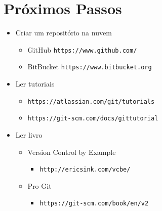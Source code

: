 \documentclass{beamer}
\newenvironment{slide}{\begin{frame}{\insertsection}}{\end{frame}}
\begin{document}
\section{Próximos Passos}
\begin{slide}
    \begin{itemize}
        \item Criar um repositório na nuvem
        \begin{itemize}
            \pause
            \item GitHub \texttt{https://www.github.com/}
            \pause
            \item BitBucket \texttt{https://www.bitbucket.org}
        \end{itemize}
        \pause
        \item Ler tutoriais
        \begin{itemize}
            \pause
            \item \texttt{https://atlassian.com/git/tutorials}
            \pause
            \item \texttt{https://git-scm.com/docs/gittutorial}
        \end{itemize}
        \pause
        \item Ler livro
        \begin{itemize}
            \pause
            \item Version Control by Example
            \begin{itemize}
                \pause
                \item \texttt{http://ericsink.com/vcbe/}
            \end{itemize}
            \pause
            \item Pro Git
            \begin{itemize}
                \pause
                \item \texttt{https://git-scm.com/book/en/v2}
            \end{itemize}
        \end{itemize}
    \end{itemize}
\end{slide}
\end{document}
